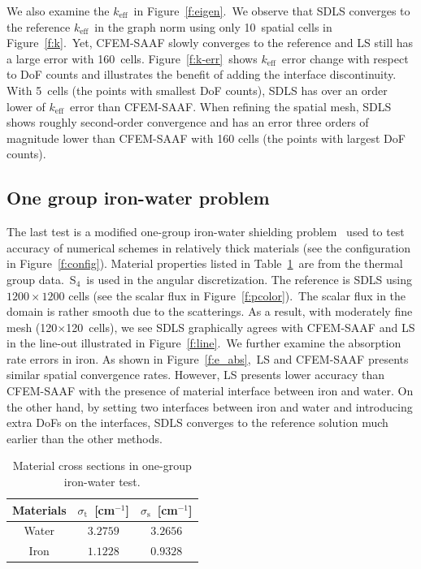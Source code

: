 \documentclass[review]{elsarticle}
\newcommand{\st}{\sigma_\mathrm{t}}
\newcommand{\mm}[1]{\mathrm{#1}}
\newcommand{\sigs}{\sigma_\mathrm{s}}
\begin{document}
{We also examine the $k_\mm{eff}$\ in Figure\ \ref{f:eigen}.\ We observe that SDLS converges to the reference $k_\mm{eff}$\ in the graph norm using only 10\ spatial cells in Figure\ \ref{f:k}.\ Yet, CFEM-SAAF slowly converges to the reference and LS still has a large error with 160\ cells. Figure\ \ref{f:k-err}\ shows $k_\mm{eff}$\ error change with respect to DoF counts and illustrates the benefit of adding the interface discontinuity. With 5\ cells (the points with smallest DoF counts), SDLS has over an order lower of $k_\mm{eff}$\ error than CFEM-SAAF. When refining the spatial mesh, SDLS shows roughly second-order convergence and has an error three orders of magnitude lower than CFEM-SAAF with 160 cells (the points with largest DoF counts).}

\subsection{One group iron-water problem}
The last test is a modified one-group iron-water shielding problem \cite{adams_iron_water}\ used to test accuracy of numerical schemes in relatively thick materials (see the configuration in Figure\ \ref{f:config}). Material properties listed in Table\ \ref{tb:iw}\ are from the thermal group data.\ S$_4$\ is used in the angular discretization. The reference is {SDLS} using $1200 \times 1200$ cells (see the scalar flux in Figure\ \ref{f:pcolor}).\ The scalar flux in the domain is rather smooth due to the scatterings. As a result, with moderately fine mesh (120$\times$120\ cells), we see SDLS graphically agrees with CFEM-SAAF and LS in the line-out illustrated in Figure\ \ref{f:line}.\ We further examine the absorption rate errors in iron. As shown in Figure\ \ref{f:e_abs},\ LS and CFEM-SAAF presents similar spatial convergence rates. However, LS presents lower accuracy than CFEM-SAAF with the presence of material interface between iron and water. On the other hand, by setting two interfaces between iron and water and introducing extra DoFs on the interfaces, SDLS converges to the reference solution much earlier than the other methods.

\begin{table}[ht!]
	\centering
	\caption{Material cross sections in one-group iron-water test.}
	\label{tb:iw}
	\hspace*{-1cm}\begin{tabular}{|c|c|c|}
		\hline
		Materials & $\st$\ [cm$^{-1}$] & $\sigs$\ [cm$^{-1}$]\\
		\hline
		Water& $3.2759$ & $3.2656$ \\
		\hline
        Iron&$1.1228$&$0.9328$\\
		\hline
	\end{tabular}
\end{table}
\end{document}
